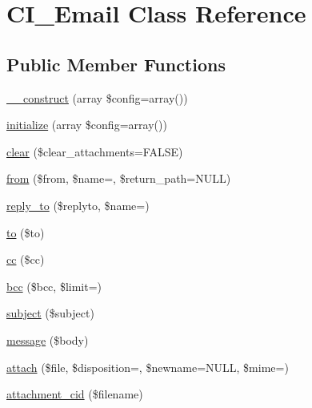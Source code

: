 \hypertarget{class_c_i___email}{}\section{C\+I\+\_\+\+Email Class Reference}
\label{class_c_i___email}
\subsection*{Public Member Functions}
\begin{DoxyCompactItemize}
\item 
\mbox{\hyperlink{class_c_i___email_a35018c0dc92a448db5c4686364ced754}{\+\_\+\+\_\+construct}} (array \$config=array())
\item 
\mbox{\hyperlink{class_c_i___email_accdda1f75fbf89ca5d63af410e60ee6d}{initialize}} (array \$config=array())
\item 
\mbox{\hyperlink{class_c_i___email_a84399b20dfff67877099743270c68538}{clear}} (\$clear\+\_\+attachments=F\+A\+L\+SE)
\item 
\mbox{\hyperlink{class_c_i___email_adfec40d06e4f3fcae4e2059dee1c26d0}{from}} (\$from, \$name=\textquotesingle{}\textquotesingle{}, \$return\+\_\+path=N\+U\+LL)
\item 
\mbox{\hyperlink{class_c_i___email_a1ee2303dece90d5b3afbb5dc75b9a0ca}{reply\+\_\+to}} (\$replyto, \$name=\textquotesingle{}\textquotesingle{})
\item 
\mbox{\hyperlink{class_c_i___email_a453e853778ae341e4fb165551d1ba1aa}{to}} (\$to)
\item 
\mbox{\hyperlink{class_c_i___email_a785e883837f95eeffed21226563fc7e5}{cc}} (\$cc)
\item 
\mbox{\hyperlink{class_c_i___email_ae7da2abc30865dd8ba3fcb3366889d7a}{bcc}} (\$bcc, \$limit=\textquotesingle{}\textquotesingle{})
\item 
\mbox{\hyperlink{class_c_i___email_aaa61b3aaa6cc4c90e26686e4bf41587a}{subject}} (\$subject)
\item 
\mbox{\hyperlink{class_c_i___email_a62559aacd297073072c30009daa8de86}{message}} (\$body)
\item 
\mbox{\hyperlink{class_c_i___email_adb1bcf392d6cf38e3f94675a21cab563}{attach}} (\$file, \$disposition=\textquotesingle{}\textquotesingle{}, \$newname=N\+U\+LL, \$mime=\textquotesingle{}\textquotesingle{})
\item 
\mbox{\hyperlink{class_c_i___email_afd601b1ddbb0fc02f16f2e39d9881299}{attachment\+\_\+cid}} (\$filename)
\item 

\end{DoxyCompactItemize}
